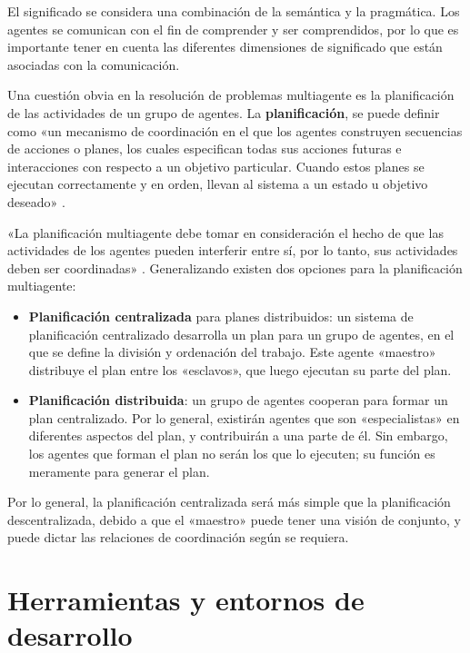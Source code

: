 El significado se considera una combinación de la semántica y la pragmática. Los agentes se comunican con el fin de comprender y ser comprendidos, por lo que es importante tener en cuenta las diferentes dimensiones de significado que están asociadas con la comunicación.

Una cuestión obvia en la resolución de problemas multiagente es la planificación de las actividades de un grupo de agentes. La \textbf{planificación}, se puede definir como «un mecanismo de coordinación en el que los agentes construyen secuencias de acciones o planes, los cuales especifican todas sus acciones futuras e interacciones con respecto a un objetivo particular. Cuando estos planes se ejecutan correctamente y en orden, llevan al sistema a un estado u objetivo deseado» \cite{PLANIFICACION}. 

«La planificación multiagente debe tomar en consideración el hecho de que las actividades de los agentes pueden interferir entre sí, por lo tanto, sus actividades deben ser coordinadas» \cite{PLANIFICACION3}. Generalizando existen dos opciones para la planificación multiagente:

\begin{itemize}
\item \textbf{Planificación centralizada} para planes distribuidos: un sistema de planificación centralizado desarrolla un plan para un grupo de agentes, en el que se define la división y ordenación del trabajo. Este agente «maestro» distribuye el plan entre los «esclavos», que luego ejecutan su parte del plan.
\item \textbf{Planificación distribuida}: un grupo de agentes cooperan para formar un plan centralizado. Por lo general, existirán agentes que son «especialistas» en diferentes aspectos del plan, y contribuirán a una parte de él. Sin embargo, los agentes que forman el plan no serán los que lo ejecuten; su función es meramente para generar el plan.	
\end{itemize}

Por lo general, la planificación centralizada será más simple que la planificación descentralizada, debido a que el «maestro» puede tener una visión de conjunto, y puede dictar las relaciones de coordinación según se requiera. 	
	
\section{Herramientas y entornos de desarrollo}
\label{sec:herrmientas}


